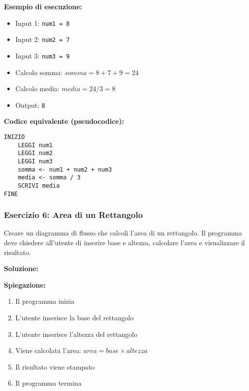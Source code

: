 \documentclass[a4paper,16pt]{article}
\begin{document}
\textbf{Esempio di esecuzione:}
\begin{itemize}
    \item Input 1: \texttt{num1 = 8}
    \item Input 2: \texttt{num2 = 7}
    \item Input 3: \texttt{num3 = 9}
    \item Calcolo somma: $somma = 8 + 7 + 9 = 24$
    \item Calcolo media: $media = 24 / 3 = 8$
    \item Output: \texttt{8}
\end{itemize}

\textbf{Codice equivalente (pseudocodice):}
\begin{lstlisting}
INIZIO
    LEGGI num1
    LEGGI num2
    LEGGI num3
    somma <- num1 + num2 + num3
    media <- somma / 3
    SCRIVI media
FINE
\end{lstlisting}

\newpage
\subsubsection{Esercizio 6: Area di un Rettangolo}

\begin{tcolorbox}[colback=blue!5!white,colframe=blue!75!black,title=Traccia]
Creare un diagramma di flusso che calcoli l'area di un rettangolo. Il programma deve chiedere all'utente di inserire base e altezza, calcolare l'area e visualizzare il risultato.
\end{tcolorbox}

\textbf{Soluzione:}

\begin{center}
\end{center}

\textbf{Spiegazione:}
\begin{enumerate}
    \item Il programma inizia
    \item L'utente inserisce la base del rettangolo
    \item L'utente inserisce l'altezza del rettangolo
    \item Viene calcolata l'area: $area = base \times altezza$
    \item Il risultato viene stampato
    \item Il programma termina
\end{enumerate}
\end{document}
